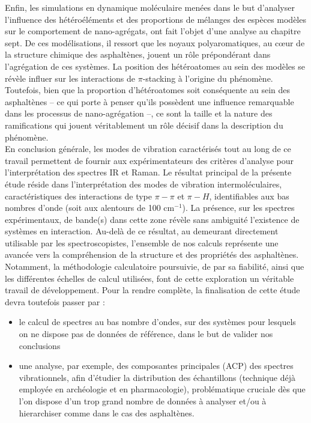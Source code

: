  
 
 	Enfin, les simulations en dynamique moléculaire menées dans le but d'analyser l'influence des hétéroéléments et des proportions de mélanges des espèces modèles sur le comportement de nano-agrégats, ont fait l'objet d'une analyse au chapitre sept. De ces modélisations, il ressort que les noyaux polyaromatiques, au cœur de la structure chimique des asphaltènes, jouent un rôle prépondérant dans l'agrégation de ces systèmes. La position des hétéroatomes au sein des modèles se révèle influer sur les interactions de $\pi$-stacking à l'origine du phénomène. Toutefois, bien que la proportion d'hétéroatomes soit conséquente au sein des asphaltènes -- ce qui porte à penser qu'ils possèdent une influence remarquable dans les processus de nano-agrégation --, ce sont la taille et la nature des ramifications qui jouent véritablement un rôle décisif dans la description du phénomène. \\
	
	
	En conclusion générale, les modes de vibration caractérisés tout au long de ce travail permettent de fournir aux expérimentateurs des critères d'analyse pour l'interprétation des spectres IR et Raman. 
	Le résultat principal de la présente étude réside dans l'interprétation des modes de vibration intermoléculaires, caractéristiques des interactions de type $\pi-\pi$ et $\pi-H$, identifiables aux bas nombres d'onde (soit aux alentours de 100 cm$^{-1}$). La présence, sur les spectres expérimentaux, de bande(s) dans cette zone révèle sans ambiguité l'existence de systèmes en interaction. Au-delà de ce résultat, au demeurant directement utilisable par les spectroscopistes, l'ensemble de nos calculs représente une avancée vers la compréhension de la structure et des propriétés des asphaltènes. Notamment, la méthodologie calculatoire poursuivie, de par sa fiabilité, ainsi que les différentes échelles de calcul utilisées, font de cette exploration un véritable travail de développement. Pour la rendre complète, la finalisation de cette étude devra toutefois passer par :
	
	\begin{itemize}
	\item le calcul de spectres au bas nombre d'ondes, sur des systèmes pour lesquels on ne dispose pas de données de référence, dans le but de valider nos conclusions
	\item une analyse, par exemple, des composantes principales (ACP) des spectres vibrationnels, afin d'étudier la distribution des échantillons (technique déjà employée en archéologie et en pharmacologie), problématique cruciale dès que l'on dispose d'un trop grand nombre de données à analyser et/ou à hierarchiser comme dans le cas des asphaltènes. 
	\end{itemize}













 	
	
	
	
	
	

	
	
	
